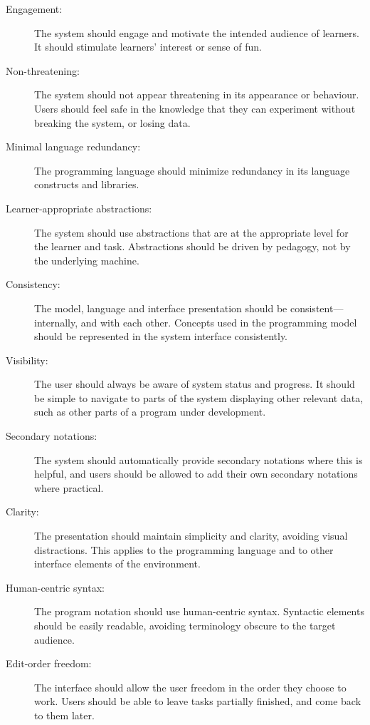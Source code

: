 {\small
\begin{description}

\item[Engagement:] The system should engage and motivate the
  intended audience of learners. It should stimulate learners'
  interest or sense of fun.

\item[Non-threatening:] The system should not appear threatening in
  its appearance or behaviour. Users should feel safe in the
  knowledge that they can experiment without breaking the system, or
  losing data.

\item[Minimal language redundancy:] The programming language should
  minimize redundancy in its language constructs and libraries.

\item[Learner-appropriate abstractions:] The system should use
  abstractions that are at the appropriate level for the learner and
  task. Abstractions should be driven by pedagogy, not by the
  underlying machine.

\item[Consistency:] The model, language and interface presentation
  should be consistent---internally, and with each other. Concepts
  used in the programming model should be represented in the system
  interface consistently.

\item[Visibility:] The user should always be aware of system status
  and progress. It should be simple to navigate to parts of the
  system displaying other relevant data, such as other parts of a
  program under development.

\item[Secondary notations:] The system should automatically provide
  secondary notations where this is helpful, and users should be
  allowed to add their own secondary notations where practical.

\item[Clarity:] The presentation should maintain simplicity and
  clarity, avoiding visual distractions. This applies to the
  programming language and to other interface elements of the
  environment.

\item[Human-centric syntax:] The program notation should use
  human-centric syntax. Syntactic elements should be easily
  readable, avoiding terminology obscure to the target audience.

\item[Edit-order freedom:] The interface should allow the user
  freedom in the order they choose to work. Users should be able to
  leave tasks partially finished, and come back to them later.


\end{description}}
